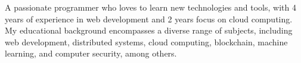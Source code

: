 

\begin{cvparagraph}
    A passionate programmer who loves to learn new technologies and tools, with 4 years of experience in web development and 2 years focus on cloud computing. My educational background encompasses a diverse range of subjects, including web development, distributed systems, cloud computing, blockchain, machine learning, and computer security, among others.
\end{cvparagraph}
